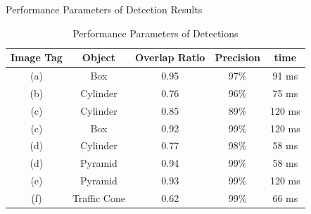 \documentclass[10pt]{beamer}
\begin{document}
\begin{frame}{Performance Parameters of Detection Results}
\begin{table}[b]
    \centering
    \begin{tabular}{|c|c|c|c|c|}
        \hline
        \textbf{Image Tag} & \textbf{Object} & \textbf{Overlap Ratio} & \textbf{Precision} & \textbf{time}\\
        \hline
        (a) & Box & 0.95 & 97\% & 91 ms\\
        \hline
        (b) & Cylinder & 0.76 & 96\% & 75 ms\\
        \hline
        (c) & Cylinder & 0.85 & 89\% & 120 ms\\
        \hline
        (c) & Box & 0.92 & 99\% & 120 ms\\
        \hline  
        (d) & Cylinder & 0.77 & 98\% & 58 ms\\
        \hline
        (d) & Pyramid & 0.94 & 99\% & 58 ms\\
        \hline
        (e) & Pyramid & 0.93 & 99\% & 120 ms\\
        \hline 
        (f) & Traffic Cone & 0.62 & 99\% & 66 ms\\
        \hline
    \end{tabular}
    \caption{Performance Parameters of Detections}
\end{table}
\end{frame}
\end{document}
